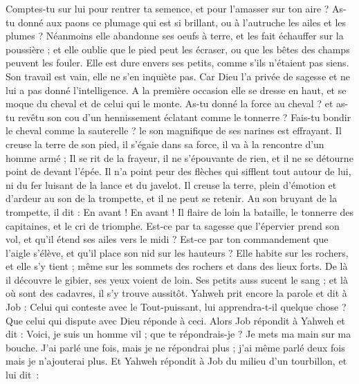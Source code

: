 \begin{multicols}{2}
Comptes-tu sur lui pour rentrer ta semence, et pour l'amasser sur ton aire ? 
As-tu donné aux paons ce plumage qui est si brillant, ou à l'autruche les ailes et les plumes ? 
Néanmoins elle abandonne ses oeufs à terre, et les fait échauffer sur la poussière ;
et elle oublie que le pied peut les écraser, ou que les bêtes des champs peuvent les fouler. 
Elle est dure envers ses petits, comme s’ils n’étaient pas siens. Son travail est vain, elle ne s’en inquiète pas.
Car Dieu l'a privée de sagesse et ne lui a pas donné l'intelligence.
A la première occasion elle se dresse en haut, et se moque du cheval et de celui qui le monte. 
As-tu donné la force au cheval ? et as-tu revêtu son cou d'un hennissement éclatant comme le tonnerre ? 
Fais-tu bondir le cheval comme la sauterelle ? le son magnifique de ses narines est effrayant.
Il creuse la terre de son pied, il s'égaie dans sa force, il va à la rencontre d'un homme armé ;
Il se rit de la frayeur, il ne s'épouvante de rien, et il ne se détourne point de devant l'épée.
Il n'a point peur des flèches qui sifflent tout autour de lui, ni du fer luisant de la lance et du javelot. 
Il creuse la terre, plein d'émotion et d'ardeur au son de la trompette, et il ne peut se retenir. 
Au son bruyant de la trompette, il dit : En avant ! En avant ! Il flaire de loin la bataille, le tonnerre des capitaines, et le cri de triomphe.
Est-ce par ta sagesse que l'épervier prend son vol, et qu'il étend ses ailes vers le midi ?
Est-ce par ton commandement que l'aigle s'élève, et qu'il place son nid sur les hauteurs ?
Elle habite sur les rochers, et elle s'y tient ; même sur les sommets des rochers et dans des lieux forts. 
De là il découvre le gibier, ses yeux voient de loin.
Ses petits auss sucent le sang ; et là où sont des cadavres, il s'y trouve aussitôt.
Yahweh prit encore la parole et dit à Job :
Celui qui conteste avec le Tout-puissant, lui apprendra-t-il quelque chose ? Que celui qui dispute avec Dieu réponde à ceci.
Alors Job répondit à Yahweh et dit :
Voici, je suis un homme vil ; que te répondrais-je ? Je mets ma main sur ma bouche.
J'ai parlé une fois, mais je ne répondrai plus ; j'ai même parlé deux fois mais je n'ajouterai plus.
\VerseOne{}Et Yahweh répondit à Job du milieu d'un tourbillon, et lui dit :

\end{multicols}
